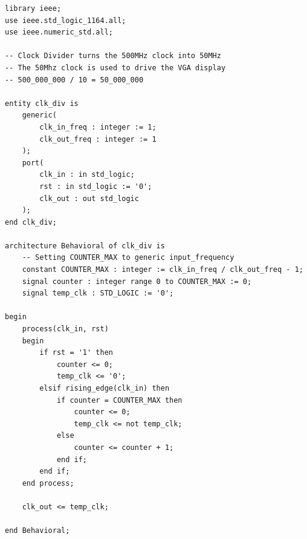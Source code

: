\documentclass{article}
\begin{document}
\begin{lstlisting}[caption=Clock Divider for Part 3, label=lst:clock-divider-part-3]
library ieee;
use ieee.std_logic_1164.all;
use ieee.numeric_std.all;

-- Clock Divider turns the 500MHz clock into 50MHz 
-- The 50Mhz clock is used to drive the VGA display
-- 500_000_000 / 10 = 50_000_000 

entity clk_div is
    generic(
        clk_in_freq : integer := 1;
        clk_out_freq : integer := 1
    );
    port(
        clk_in : in std_logic;
        rst : in std_logic := '0';
        clk_out : out std_logic
    );
end clk_div;

architecture Behavioral of clk_div is
    -- Setting COUNTER_MAX to generic input_frequency
    constant COUNTER_MAX : integer := clk_in_freq / clk_out_freq - 1; 
    signal counter : integer range 0 to COUNTER_MAX := 0;
    signal temp_clk : STD_LOGIC := '0';

begin
    process(clk_in, rst)
    begin
        if rst = '1' then
            counter <= 0;
            temp_clk <= '0';
        elsif rising_edge(clk_in) then
            if counter = COUNTER_MAX then
                counter <= 0;
                temp_clk <= not temp_clk;
            else
                counter <= counter + 1;
            end if;
        end if;
    end process;

    clk_out <= temp_clk;

end Behavioral;
\end{lstlisting}
\end{document}
